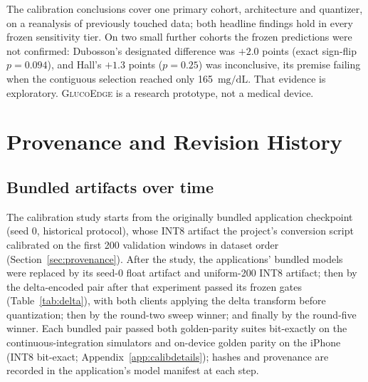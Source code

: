 \documentclass[10pt,twocolumn]{article}
\newcommand{\mgdl}{\ensuremath{\mathrm{mg/dL}}}
\newcommand{\project}{\textsc{GlucoEdge}\xspace}
\begin{document}
The calibration conclusions cover one primary cohort, architecture and
quantizer, on a reanalysis of previously touched
data; both headline findings hold in every frozen sensitivity tier. On
two small further
cohorts the frozen predictions were not confirmed: Dubosson's designated
difference was $+2.0$ points (exact sign-flip $p=0.094$), and Hall's
$+1.3$ points ($p=0.25$) was inconclusive, its premise failing when the
contiguous selection reached only 165~\mgdl. That evidence is
exploratory. \project is a research prototype, not a medical device.


\begingroup
\small
\setlength{\bibsep}{0pt}

\endgroup

\clearpage
\appendix
\renewcommand{\topfraction}{0.9}
\renewcommand{\dbltopfraction}{0.9}
\renewcommand{\textfraction}{0.07}
\renewcommand{\floatpagefraction}{0.8}
\renewcommand{\dblfloatpagefraction}{0.8}
\setcounter{topnumber}{4}
\setcounter{dbltopnumber}{4}
\setcounter{totalnumber}{6}
\makeatletter
\setlength{\@fptop}{0pt}
\setlength{\@fpsep}{\floatsep}
\setlength{\@fpbot}{0pt plus 1fil}
\setlength{\@dblfptop}{0pt}
\setlength{\@dblfpsep}{\dblfloatsep}
\setlength{\@dblfpbot}{0pt plus 1fil}
\makeatother

\section{Provenance and Revision History}
\label{app:history}

\subsection{Bundled artifacts over time}

The calibration study starts from the originally bundled application
checkpoint (seed 0, historical protocol), whose INT8 artifact the
project's conversion script calibrated on the first 200 validation windows
in dataset order (Section~\ref{sec:provenance}). After the study, the
applications' bundled models were replaced by its seed-0 float artifact
and uniform-200 INT8 artifact; then by the delta-encoded pair after that
experiment passed its frozen gates (Table~\ref{tab:delta}), with both
clients applying the delta transform before quantization; then by the
round-two sweep winner; and finally by the round-five winner. Each bundled
pair passed both golden-parity suites bit-exactly on the
continuous-integration simulators and on-device golden parity on the
iPhone (INT8 bit-exact; Appendix~\ref{app:calibdetails}); hashes and
provenance are recorded in the application's model manifest at each step.
\end{document}

